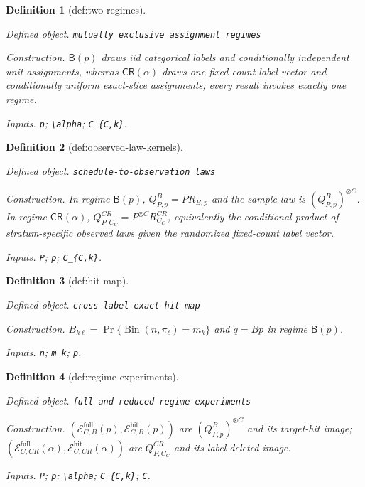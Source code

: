 \documentclass{article}
\newtheorem{definition}{Definition}
\begin{document}
\begin{definition}[def:two-regimes]\label{def:two-regimes}
\par\smallskip\noindent\emph{Defined object.} \texttt{mutually exclusive assignment regimes}
\par\smallskip\noindent\emph{Construction.} \(\mathsf B(p)\) draws iid categorical labels and conditionally independent unit assignments, whereas \(\mathsf{CR}(\alpha)\) draws one fixed-count label vector and conditionally uniform exact-slice assignments; every result invokes exactly one regime.
\par\smallskip\noindent\emph{Inputs.} \texttt{p}; \texttt{\textbackslash{}\allowbreak{}alpha}; \texttt{C\_\allowbreak{}\{C,\allowbreak{}k\}\allowbreak{}}.
\end{definition}

\begin{definition}[def:observed-law-kernels]\label{def:observed-law-kernels}
\par\smallskip\noindent\emph{Defined object.} \texttt{schedule-\allowbreak{}to-\allowbreak{}observation laws}
\par\smallskip\noindent\emph{Construction.} In regime \(\mathsf B(p)\), \(Q^B_{P,p}=P R_{B,p}\) and the sample law is \((Q^B_{P,p})^{\otimes C}\). In regime \(\mathsf{CR}(\alpha)\), \(Q^{CR}_{P,C_C}=P^{\otimes C}R^{CR}_{C_C}\), equivalently the conditional product of stratum-specific observed laws given the randomized fixed-count label vector.
\par\smallskip\noindent\emph{Inputs.} \texttt{P}; \texttt{p}; \texttt{C\_\allowbreak{}\{C,\allowbreak{}k\}\allowbreak{}}.
\end{definition}

\begin{definition}[def:hit-map]\label{def:hit-map}
\par\smallskip\noindent\emph{Defined object.} \texttt{cross-\allowbreak{}label exact-\allowbreak{}hit map}
\par\smallskip\noindent\emph{Construction.} \(B_{k\ell}=\Pr\{\operatorname{Bin}(n,\pi_\ell)=m_k\}\) and \(q=Bp\) in regime \(\mathsf B(p)\).
\par\smallskip\noindent\emph{Inputs.} \texttt{n}; \texttt{m\_\allowbreak{}k}; \texttt{p}.
\end{definition}

\begin{definition}[def:regime-experiments]\label{def:regime-experiments}
\par\smallskip\noindent\emph{Defined object.} \texttt{full and reduced regime experiments}
\par\smallskip\noindent\emph{Construction.} \((\mathcal E_{C,B}^{\mathrm{full}}(p),\mathcal E_{C,B}^{\mathrm{hit}}(p))\) are \((Q^B_{P,p})^{\otimes C}\) and its target-hit image; \((\mathcal E_{C,CR}^{\mathrm{full}}(\alpha),\mathcal E_{C,CR}^{\mathrm{hit}}(\alpha))\) are \(Q^{CR}_{P,C_C}\) and its label-deleted image.
\par\smallskip\noindent\emph{Inputs.} \texttt{P}; \texttt{p}; \texttt{\textbackslash{}\allowbreak{}alpha}; \texttt{C\_\allowbreak{}\{C,\allowbreak{}k\}\allowbreak{}}; \texttt{C}.
\end{definition}
\end{document}
